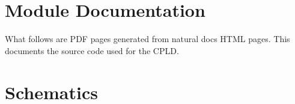 \documentclass[usletter]{article}
\begin{document}
  

  \section{Module Documentation}
  \par What follows are PDF pages generated from natural docs HTML pages. This documents
  the source code used for the CPLD.

  

  \section{Schematics}

  

  
\end{document}

